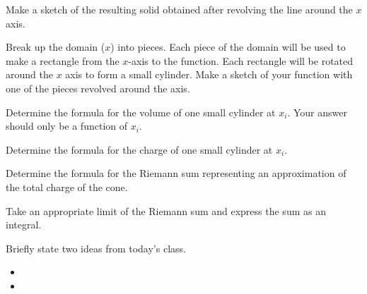 \begin{problem}
\begin{subproblem}
       \item Make a sketch of the resulting solid obtained after
         revolving the line around the $x$ axis.
         \vfill

       \item Break up the domain ($x$) into pieces. Each piece of the
         domain will be used to make a rectangle from the $x$-axis to
         the function. Each rectangle will be rotated around the $x$
         axis to form a small cylinder.  Make a sketch of your
         function with one of the pieces revolved around the axis.
         \vfill

       \clearpage

       \item Determine the formula for the volume of one small cylinder at $x_i$. Your answer should only be a function of $x_i$.
         \vfill

       \item Determine the formula for the charge of one small cylinder at $x_i$.
         \vfill

       \item Determine the formula for the Riemann sum representing an
         approximation of the total charge of the cone.
         \vfill

       \item Take an appropriate limit of the Riemann sum and express
         the sum as an integral. 
         \vfill

     \end{subproblem}

\end{problem}

\postClass

\begin{problem}
\item Briefly state two ideas from today's class.
  \begin{itemize}
  \item
  \item
  \end{itemize}
\item
  \begin{subproblem}
    \item
  \end{subproblem}
\end{problem}



